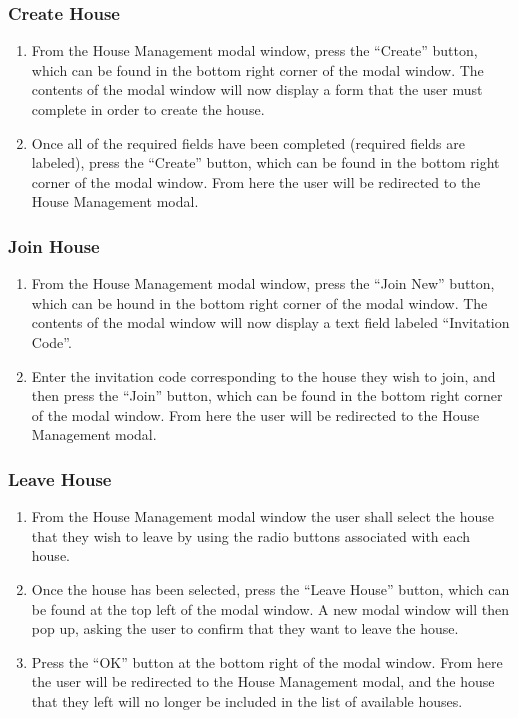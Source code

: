 \documentclass[12pt]{article}
\begin{document}
    \subsubsection{Create House}
    \begin{enumerate}
        \item From the House Management modal window, press the ``Create'' button, which can be found in the bottom right corner of the modal window. The contents of the modal window will now display a form that the user must complete in order to create the house.
        \item Once all of the required fields have been completed (required fields are labeled), press the ``Create'' button, which can be found in the bottom right corner of the modal window. From here the user will be redirected to the House Management modal.
    \end{enumerate}
    
    \subsubsection{Join House}
    \begin{enumerate}
        \item From the House Management modal window, press the ``Join New'' button, which can be hound in the bottom right corner of the modal window. The contents of the modal window will now display a text field labeled ``Invitation Code''.
        \item Enter the invitation code corresponding to the house they wish to join, and then press the ``Join'' button, which can be found in the bottom right corner of the modal window. From here the user will be redirected to the House Management modal.
    \end{enumerate}
    
    \subsubsection{Leave House}
    \begin{enumerate}
        \item From the House Management modal window the user shall select the house that they wish to leave by using the radio buttons associated with each house.
        \item Once the house has been selected, press the ``Leave House'' button, which can be found at the top left of the modal window. A new modal window will then pop up, asking the user to confirm that they want to leave the house.
        \item Press the ``OK'' button at the bottom right of the modal window. From here the user will be redirected to the House Management modal, and the house that they left will no longer be included in the list of available houses.
    \end{enumerate}
    
\end{document}
